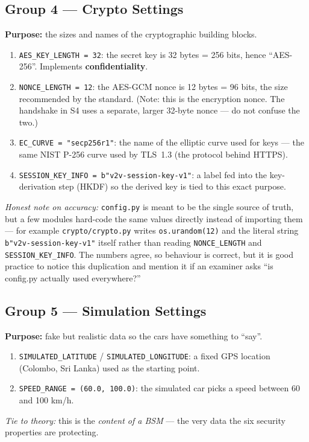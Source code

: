 \documentclass[11pt,a4paper]{article}
\begin{document}
\subsection{Group 4 --- Crypto Settings}
\textbf{Purpose:} the sizes and names of the cryptographic building blocks.
\begin{enumerate}
  \item \texttt{AES\_KEY\_LENGTH = 32}: the secret key is 32 bytes = 256 bits,
        hence ``AES-256''. Implements \textbf{confidentiality}.
  \item \texttt{NONCE\_LENGTH = 12}: the AES-GCM nonce is 12 bytes = 96 bits,
        the size recommended by the standard. (Note: this is the encryption
        nonce. The handshake in S4 uses a separate, larger 32-byte nonce ---
        do not confuse the two.)
  \item \texttt{EC\_CURVE = "secp256r1"}: the name of the elliptic curve used
        for keys --- the same NIST P-256 curve used by TLS~1.3 (the protocol
        behind HTTPS).
  \item \texttt{SESSION\_KEY\_INFO = b"v2v-session-key-v1"}: a label fed into the
        key-derivation step (HKDF) so the derived key is tied to this exact
        purpose.
\end{enumerate}
\emph{Honest note on accuracy:} \texttt{config.py} is meant to be the single
source of truth, but a few modules hard-code the same values directly instead of
importing them --- for example \texttt{crypto/crypto.py} writes
\texttt{os.urandom(12)} and the literal string \texttt{b"v2v-session-key-v1"}
itself rather than reading \texttt{NONCE\_LENGTH} and \texttt{SESSION\_KEY\_INFO}.
The numbers agree, so behaviour is correct, but it is good practice to notice
this duplication and mention it if an examiner asks ``is config.py actually
used everywhere?''

\subsection{Group 5 --- Simulation Settings}
\textbf{Purpose:} fake but realistic data so the cars have something to ``say''.
\begin{enumerate}
  \item \texttt{SIMULATED\_LATITUDE} / \texttt{SIMULATED\_LONGITUDE}: a fixed GPS
        location (Colombo, Sri Lanka) used as the starting point.
  \item \texttt{SPEED\_RANGE = (60.0, 100.0)}: the simulated car picks a speed
        between 60 and 100 km/h.
\end{enumerate}
\emph{Tie to theory:} this is the \emph{content of a BSM} --- the very data the
six security properties are protecting.
\end{document}
